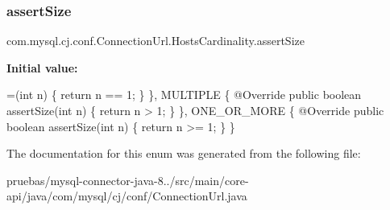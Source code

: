 \subsubsection{\texorpdfstring{assert\+Size}{assertSize}}
{\footnotesize\ttfamily com.\+mysql.\+cj.\+conf.\+Connection\+Url.\+Hosts\+Cardinality.\+assert\+Size}

{\bfseries Initial value\+:}
\begin{DoxyCode}
=(\textcolor{keywordtype}{int} n) \{
                \textcolor{keywordflow}{return} n == 1;
            \}
        \},
        MULTIPLE \{
            @Override
            \textcolor{keyword}{public} \textcolor{keywordtype}{boolean} assertSize(\textcolor{keywordtype}{int} n) \{
                \textcolor{keywordflow}{return} n > 1;
            \}
        \},
        ONE\_OR\_MORE \{
            @Override
            \textcolor{keyword}{public} \textcolor{keywordtype}{boolean} assertSize(\textcolor{keywordtype}{int} n) \{
                \textcolor{keywordflow}{return} n >= 1;
            \}
        \}
\end{DoxyCode}


The documentation for this enum was generated from the following file\+:\begin{DoxyCompactItemize}
\item 
pruebas/mysql-\/connector-\/java-\/8../src/main/core-\/api/java/com/mysql/cj/conf/Connection\+Url.\+java\end{DoxyCompactItemize}
